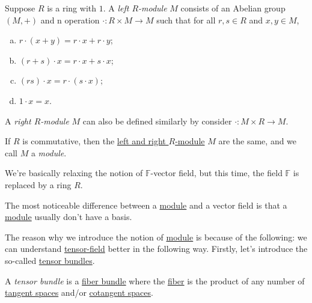 \begin{definition}\label{def:left-module}
	Suppose \(R\) is a ring with \(1\). A \emph{left \(R\)-module} \(M\) consists of an Abelian group \((M, +)\) and n operation \(\cdot \colon R \times M \to M\) such that for all \(r, s\in R\) and \(x, y\in M\),
	\begin{enumerate}[(a)]
		\item \(r\cdot (x+y) = r\cdot x + r\cdot y\);
		\item \((r+s)\cdot x = r\cdot x + s\cdot x\);
		\item \((rs)\cdot x = r\cdot (s\cdot x)\);
		\item \(1\cdot x = x\).
	\end{enumerate}
\end{definition}

\begin{note}
	A \emph{right \(R\)-module} \(M\) can also be defined similarly by consider \(\cdot \colon M \times R \to M\).
\end{note}

\begin{definition}[Module]\label{def:module}
	If \(R\) is commutative, then the \hyperref[def:left-module]{left and right \(R\)-module} \(M\) are the same, and we call \(M\) a \emph{module}.
\end{definition}

\begin{intuition}
	We're basically relaxing the notion of \(\mathbb{F} \)-vector field, but this time, the field \(\mathbb{F} \) is replaced by a ring \(R\).
\end{intuition}

\begin{remark}
	The most noticeable difference between a \hyperref[def:module]{module} and a vector field is that a \hyperref[def:module]{module} usually don't have a basis.
\end{remark}

The reason why we introduce the notion of \hyperref[def:module]{module} is because of the following: we can understand \hyperref[def:tensor-field]{tensor-field} better in the following way. Firstly, let's introduce the so-called \hyperref[def:tensor-bundle]{tensor bundles}.

\begin{definition}\label{def:tensor-bundle}
	A \emph{tensor bundle} is a \hyperref[def:bundle]{fiber bundle} where the \hyperref[def:fiber]{fiber} is the product of any number of \hyperref[def:tangent-space]{tangent spaces} and/or \hyperref[def:cotangent-space]{cotangent spaces}.
\end{definition}

